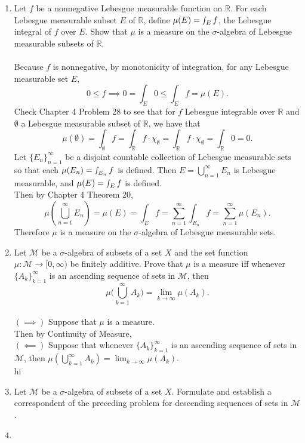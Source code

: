 \begin{enumerate}
	\setcounter{enumi}{0}
	\item Let $f$ be a nonnegative Lebesgue measurable function on $\mathbb{R}$. 
	For each Lebesgue measurable subset $E$ of $\mathbb{R}$, define $\mu(E) = \smallint_E f$, the Lebesgue integral of $f$ over $E$.
	Show that $\mu$ is a measure on the $\sigma$-algebra of Lebesgue measurable subsets of $\mathbb{R}$.\\
	\\Because $f$ is nonnegative, by monotonicity of integration, for any Lebesgue measurable set $E$, 
	\[
		0\le f\implies 0=\int_E 0\le \int_E f=\mu(E).
	\]
	Check Chapter 4 Problem 28 to see that for $f$ Lebesgue integrable over $\mathbb{R}$ and $\emptyset$ a Lebesgue measurable subset of $\mathbb{R}$, we have that
	\[
		\mu(\emptyset)=\int_\emptyset f=\int_\mathbb{R} f\cdot\chi_\emptyset=\int_\mathbb{R} f\cdot\chi_\emptyset=\int_\mathbb{R} 0 = 0.
	\]
	Let $\{E_n\}_{n=1}^\infty$ be a disjoint countable collection of Lebesgue measurable sets so that each $\mu(E_n) = \smallint_{E_n} f$ is defined.
	Then $E=\bigcup_{n=1}^\infty E_n$ is Lebesgue measurable, and $\mu(E) = \smallint_E f$ is defined.
	\\Then by Chapter 4 Theorem 20,
	\[
		\mu(\bigcup_{n=1}^\infty E_n)=\mu(E)=\int_E f =\sum_{n=1}^\infty\int_{E_n}f=\sum_{n=1}^\infty\mu(E_n).
	\]
	Therefore $\mu$ is a measure on the $\sigma$-algebra of Lebesgue measurable sets. 
	\item Let $\mathcal{M}$ be a $\sigma$-algebra of subsets of a set $X$ and the set function $\mu : \mathcal{M} \to [0,\infty)$ be finitely additive.
	Prove that $\mu$ is a measure iff whenever $\{A_k\}_{k=1}^\infty$ is an ascending sequence of sets in $\mathcal{M}$, then
	\[
	\mu \biggl ( \bigcup_{k=1}^\infty A_k \biggr ) = \lim_{k \to \infty} \mu(A_k).	
	\]
	\\$(\implies)$ Suppose that $\mu$ is a measure.\\
	Then by Continuity of Measure, 
	\\$(\impliedby)$ Suppose that whenever $\{A_k\}_{k=1}^\infty$ is an ascending sequence of sets in $\mathcal{M}$, then $\mu ( \bigcup_{k=1}^\infty A_k ) = \lim_{k \to \infty} \mu(A_k)$.\\
	hi
	\item Let $\mathcal{M}$ be a $\sigma$-algebra of subsets of a set $X$. Formulate and establish a correspondent of the preceding problem for descending sequences of sets in $\mathcal{M}$.
	\item 
\end{enumerate}

